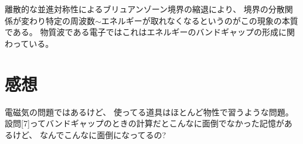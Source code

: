 \documentclass[../../master.tex]{subfiles}
\begin{document}
\section{}
離散的な並進対称性によるブリュアンゾーン境界の縮退により、
境界の分散関係が変わり特定の周波数\(\sim\)エネルギーが取れなくなるというのがこの現象の本質である。
物質波である電子ではこれはエネルギーのバンドギャップの形成に関わっている。


\section*{感想}
電磁気の問題ではあるけど、
使ってる道具はほとんど物性で習うような問題。
設問[7]ってバンドギャップのときの計算だとこんなに面倒でなかった記憶があるけど、
なんでこんなに面倒になってるの?
\end{document}
